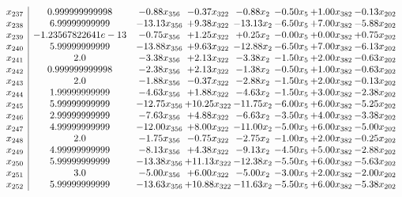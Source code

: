 \documentclass[8pt]{article}
\begin{document}
\[\begin{array}{c| c c@{\hskip 2pt} c@{\hskip 2pt} c@{\hskip 2pt} c@{\hskip 2pt} c@{\hskip 2pt} c@{\hskip 2pt} }
 x_{237}   &  0.999999999998 & -0.88 x_{356} & -0.37 x_{322} & -0.88 x_{2} & -0.50 x_{5} & +  1.00 x_{382} & -0.13 x_{202}\\
 x_{238}   &  6.99999999999 & -13.13 x_{356} & +  9.38 x_{322} & -13.13 x_{2} & -6.50 x_{5} & +  7.00 x_{382} & -5.88 x_{202}\\
 x_{239}   &  -1.23567822641e-13 & -0.75 x_{356} & +  1.25 x_{322} & +  0.25 x_{2} & -0.00 x_{5} & +  0.00 x_{382} & +  0.75 x_{202}\\
 x_{240}   &  5.99999999999 & -13.88 x_{356} & +  9.63 x_{322} & -12.88 x_{2} & -6.50 x_{5} & +  7.00 x_{382} & -6.13 x_{202}\\
 x_{241}   &  2.0 & -3.38 x_{356} & +  2.13 x_{322} & -3.38 x_{2} & -1.50 x_{5} & +  2.00 x_{382} & -0.63 x_{202}\\
 x_{242}   &  0.999999999998 & -2.38 x_{356} & +  2.13 x_{322} & -1.38 x_{2} & -0.50 x_{5} & +  1.00 x_{382} & -0.63 x_{202}\\
 x_{243}   &  2.0 & -1.88 x_{356} & -0.37 x_{322} & -2.88 x_{2} & -1.50 x_{5} & +  2.00 x_{382} & -0.13 x_{202}\\
 x_{244}   &  1.99999999999 & -4.63 x_{356} & +  1.88 x_{322} & -4.63 x_{2} & -1.50 x_{5} & +  3.00 x_{382} & -2.38 x_{202}\\
 x_{245}   &  5.99999999999 & -12.75 x_{356} & + 10.25 x_{322} & -11.75 x_{2} & -6.00 x_{5} & +  6.00 x_{382} & -5.25 x_{202}\\
 x_{246}   &  2.99999999999 & -7.63 x_{356} & +  4.88 x_{322} & -6.63 x_{2} & -3.50 x_{5} & +  4.00 x_{382} & -3.38 x_{202}\\
 x_{247}   &  4.99999999999 & -12.00 x_{356} & +  8.00 x_{322} & -11.00 x_{2} & -5.00 x_{5} & +  6.00 x_{382} & -5.00 x_{202}\\
 x_{248}   &  2.0 & -1.75 x_{356} & -0.75 x_{322} & -2.75 x_{2} & -1.00 x_{5} & +  2.00 x_{382} & -0.25 x_{202}\\
 x_{249}   &  4.99999999999 & -8.13 x_{356} & +  4.38 x_{322} & -9.13 x_{2} & -4.50 x_{5} & +  5.00 x_{382} & -2.88 x_{202}\\
 x_{250}   &  5.99999999999 & -13.38 x_{356} & + 11.13 x_{322} & -12.38 x_{2} & -5.50 x_{5} & +  6.00 x_{382} & -5.63 x_{202}\\
 x_{251}   &  3.0 & -5.00 x_{356} & +  6.00 x_{322} & -5.00 x_{2} & -3.00 x_{5} & +  2.00 x_{382} & -2.00 x_{202}\\
 x_{252}   &  5.99999999999 & -13.63 x_{356} & + 10.88 x_{322} & -11.63 x_{2} & -5.50 x_{5} & +  6.00 x_{382} & -5.38 x_{202}\\

\end{array}\]
\end{document}
